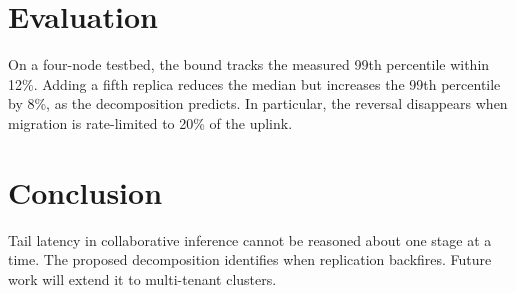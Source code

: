 \documentclass[conference]{IEEEtran}
\begin{document}
\section{Evaluation}
\label{sec:eval}
On a four-node testbed, the bound tracks the measured 99th percentile within 12\%.
Adding a fifth replica reduces the median but increases the 99th percentile by 8\%, as the decomposition predicts.
In particular, the reversal disappears when migration is rate-limited to 20\% of the uplink.

\section{Conclusion}
\label{sec:conclusion}
Tail latency in collaborative inference cannot be reasoned about one stage at a time.
The proposed decomposition identifies when replication backfires.
Future work will extend it to multi-tenant clusters.
\end{document}
